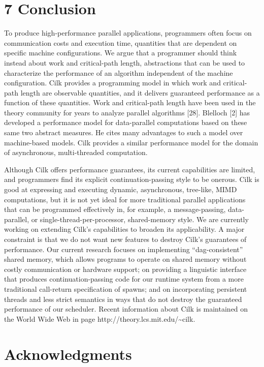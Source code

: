 \documentclass[
]{article}
\begin{document}
\section{7 Conclusion}\label{conclusion}

To produce high-performance parallel applications, programmers often
focus on communication costs and execution time, quantities that are
dependent on specific machine configurations. We argue that a programmer
should think instead about work and critical-path length, abstractions
that can be used to characterize the performance of an algorithm
independent of the machine configuration. Cilk provides a programming
model in which work and critical-path length are observable quantities,
and it delivers guaranteed performance as a function of these
quantities. Work and critical-path length have been used in the theory
community for years to analyze parallel algorithms {[}28{]}. Blelloch
{[}2{]} has developed a performance model for data-parallel computations
based on these same two abstract measures. He cites many advantages to
such a model over machine-based models. Cilk provides a similar
performance model for the domain of asynchronous, multi-threaded
computation.

Although Cilk offers performance guarantees, its current capabilities
are limited, and programmers find its explicit continuation-passing
style to be onerous. Cilk is good at expressing and executing dynamic,
asynchronous, tree-like, MIMD computations, but it is not yet ideal for
more traditional parallel applications that can be programmed
effectively in, for example, a message-passing, data-parallel, or
single-thread-per-processor, shared-memory style. We are currently
working on extending Cilk's capabilities to broaden its applicability. A
major constraint is that we do not want new features to destroy Cilk's
guarantees of performance. Our current research focuses on implementing
``dag-consistent'' shared memory, which allows programs to operate on
shared memory without costly communication or hardware support; on
providing a linguistic interface that produces continuation-passing code
for our runtime system from a more traditional call-return specification
of spawns; and on incorporating persistent threads and less strict
semantics in ways that do not destroy the guaranteed performance of our
scheduler. Recent information about Cilk is maintained on the World Wide
Web in page http://theory.lcs.mit.edu/\textasciitilde cilk.

\section{Acknowledgments}\label{acknowledgments}
\end{document}
